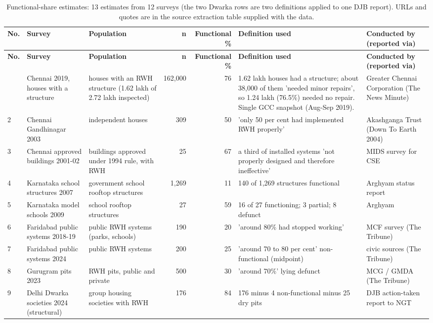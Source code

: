 {\scriptsize\setlength{\tabcolsep}{3pt}
\begin{longtable}{l p{2.8cm} p{2.6cm} r r p{4.6cm} p{2.9cm}}
\caption{Functional-share estimates: 13 estimates from 12 surveys (the two Dwarka rows are two definitions applied to one DJB report). URLs and quotes are in the source extraction table supplied with the data.}\label{tab:func}\\
\toprule
\textbf{No.} & \textbf{Survey} & \textbf{Population} & \textbf{n} & \textbf{Functional \%} & \textbf{Definition used} & \textbf{Conducted by (reported via)}\\ \midrule\endfirsthead
\toprule \textbf{No.} & \textbf{Survey} & \textbf{Population} & \textbf{n} & \textbf{Functional \%} & \textbf{Definition used} & \textbf{Conducted by (reported via)}\\ \midrule\endhead
\bottomrule\endfoot
1 & Chennai 2019, houses with a structure & houses with an RWH structure (1.62 lakh of 2.72 lakh inspected) & 162,000 & 76 & 1.62 lakh houses had a structure; about 38,000 of them 'needed minor repairs', so 1.24 lakh (76.5\%) needed no repair. Single GCC snapshot (Aug-Sep 2019). & Greater Chennai Corporation (The News Minute)\\
2 & Chennai Gandhinagar 2003 & independent houses & 309 & 50 & 'only 50 per cent had implemented RWH properly' & Akashganga Trust (Down To Earth 2004)\\
3 & Chennai approved buildings 2001-02 & buildings approved under 1994 rule, with RWH & 25 & 67 & a third of installed systems 'not properly designed and therefore ineffective' & MIDS survey for CSE\\
4 & Karnataka school structures 2007 & government school rooftop structures & 1,269 & 11 & 140 of 1,269 structures functional & Arghyam status report\\
5 & Karnataka model schools 2009 & school rooftop structures & 27 & 59 & 16 of 27 functioning; 3 partial; 8 defunct & Arghyam\\
6 & Faridabad public systems 2018-19 & public RWH systems (parks, schools) & 190 & 20 & 'around 80\% had stopped working' & MCF survey (The Tribune)\\
7 & Faridabad public systems 2024 & public RWH systems & 200 & 25 & 'around 70 to 80 per cent' non-functional (midpoint) & civic sources (The Tribune)\\
8 & Gurugram pits 2023 & RWH pits, public and private & 500 & 30 & 'around 70\%' lying defunct & MCG / GMDA (The Tribune)\\
9 & Delhi Dwarka societies 2024 (structural) & group housing societies with RWH & 176 & 84 & 176 minus 4 non-functional minus 25 dry pits & DJB action-taken report to NGT\\

\end{longtable}}

